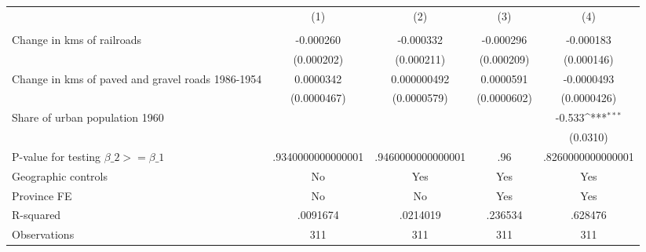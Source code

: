{
\def\sym#1{\ifmmode^{#1}\else\(^{#1}\)\fi}
\begin{tabular}{l*{4}{c}}
\hline\hline
                &\multicolumn{1}{c}{(1)}&\multicolumn{1}{c}{(2)}&\multicolumn{1}{c}{(3)}&\multicolumn{1}{c}{(4)}\\
                &\multicolumn{1}{c}{}&\multicolumn{1}{c}{}&\multicolumn{1}{c}{}&\multicolumn{1}{c}{}\\
\hline
Change in kms of railroads&-0.000260         &-0.000332         &-0.000296         &-0.000183         \\
                &(0.000202)         &(0.000211)         &(0.000209)         &(0.000146)         \\
[1em]
Change in kms of paved and gravel roads 1986-1954&0.0000342         &0.000000492         &0.0000591         &-0.0000493         \\
                &(0.0000467)         &(0.0000579)         &(0.0000602)         &(0.0000426)         \\
[1em]
Share of urban population 1960&                  &                  &                  &   -0.533\sym{***}\\
                &                  &                  &                  & (0.0310)         \\
\hline
P-value for testing $\beta\_{2} >= \beta\_{1}$&.9340000000000001         &.9460000000000001         &      .96         &.8260000000000001         \\
Geographic controls&       No         &      Yes         &      Yes         &      Yes         \\
Province FE     &       No         &       No         &      Yes         &      Yes         \\
R-squared       & .0091674         & .0214019         &  .236534         &  .628476         \\
Observations    &      311         &      311         &      311         &      311         \\
\hline\hline
\end{tabular}
}
